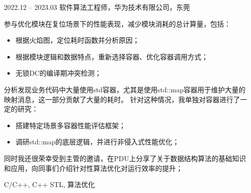 %
%

 
\begin{experiences}
  \experiencenew
  {2022.12 -- 2023.03} {软件算法工程师，华为技术有限公司，东莞}
  {
    参与优化模块在复位场景下的性能表现，减少模块消耗的总计算量，包括：
    \begin{itemize}
  		\item 根据火焰图，定位耗时函数并分析原因；
  		\item 根据模块逻辑和数据特点，重新选择容器、优化容器调用方式；
  		\item 无锁DC的编译期冲突检测；
  	\end{itemize}
    分析发现业务代码中大量使用std容器，尤其是使用std::map容器用于维护大量的映射消息，这一部分贡献了大量的耗时。
    针对这种情况，我单独对容器进行了一定的研究：
    \begin{itemize}
  		\item 搭建特定场景多容器性能评估框架；
  		\item 调研std::map的底层逻辑，并进行非侵入式性能优化；
  	\end{itemize}
    同时我还很荣幸受到主管的邀请，在PDU上分享了关于数据结构算法的基础知识和应用，向同事们介绍针对性算法优化对运行效率的提升；
                }
                {C/C++, C++ STL, 算法优化}



\end{experiences}
